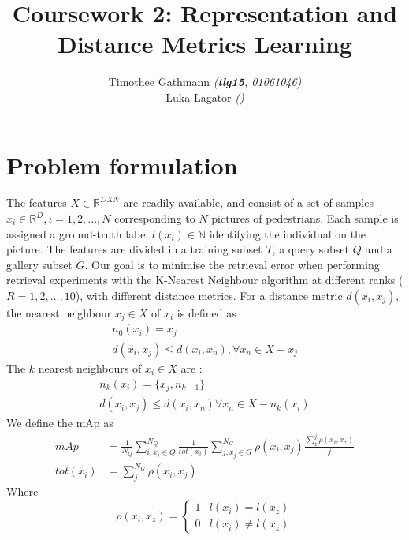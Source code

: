 \documentclass[10pt,technote]{IEEEtran}
\title{Coursework 2: Representation and Distance Metrics Learning }
\author{Timothee Gathmann \textit{(\textbf{tlg15}, 01061046)}\\ Luka Lagator\textit{ ()}}
\begin{document}
\maketitle

\section{Problem formulation}
The features $X \in \mathbb{R}^{D X N}$ are readily available, and consist of a set of samples $x_i \in \mathbb{R}^D, i = 1, 2, ..., N$ corresponding to $N$ pictures of pedestrians. Each sample is assigned a ground-truth label $l(x_i) \in \mathbb{N}$ identifying the individual on the picture. The features are divided in a training subset $T$, a query subset $Q$ and a gallery subset $G$. Our goal is to minimise the retrieval error when performing retrieval experiments with the K-Nearest Neighbour algorithm \cite{Cover1967} at different ranks ($R = 1, 2, ..., 10 $), with different distance metrics. For a distance metric $d(x_i, x_j)$, the nearest neighbour $x_j \in X$ of $x_i$ is defined as
\begin{equation}
    \begin{aligned}
    n_0(x_i) = x_j \\
d(x_i, x_j) \leq d(x_i, x_n), \forall x_n \in X - x_j
    \end{aligned}
\end{equation}
The $k$ nearest neighbours of $x_i \in X$ are :
\begin{equation}
    \begin{aligned}
    n_k(x_i) = \lbrace x_j, n_{k-1}\rbrace 
    \\
    d(x_i, x_j) \leq d(x_i, x_n) \forall x_n \in X - n_k(x_i)
    \end{aligned}
\end{equation}
We define the mAp as
\begin{equation}
\begin{aligned}
    mAp & =   \frac{1}{N_Q}\sum^{N_Q}_{i, x_i \in Q}  \frac{1}{tot(x_i)}\sum^{N_G}_{j, x_j \in G}\rho(x_i, x_j)\frac{\sum^{j}_z\rho(x_i, x_z)}{j} \\ 
    tot(x_i)& = \sum^{N_G}_j\rho(x_i, x_j)
    \end{aligned}
\end{equation}
Where 
\begin{equation}
    \rho(x_i, x_z) =
    \begin{cases}
        1 & l(x_i) = l(x_z)\\
        0 & l(x_i) \neq l(x_z)
    \end{cases}
\end{equation}
\end{document}
